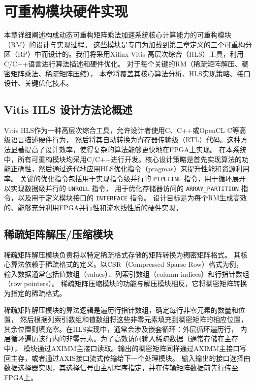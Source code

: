\chapter{可重构模块硬件实现}

本章详细阐述构成动态可重构矩阵乘法加速系统核心计算能力的可重构模块（RM）的设计与实现过程。
这些模块是专门为加载到第三章定义的三个可重构分区（RP）中而设计的。我们将采用Xilinx Vitis 高层次综合（HLS）工具，利用C/C++语言进行算法描述和硬件优化。
对于每个关键的RM（稀疏矩阵解压、稠密矩阵乘法、稀疏矩阵压缩），
本章将覆盖其核心算法分析、HLS实现策略、接口设计、关键优化技术。

\section{Vitis HLS 设计方法论概述}

Vitis HLS作为一种高层次综合工具，允许设计者使用C、C++或OpenCL C等高级语言描述硬件行为，
然后将其自动转换为寄存器传输级（RTL）代码。这种方法显著提高了设计效率，使得复杂的算法能够更快地在FPGA上实现。
在本系统中，所有可重构模块均采用C/C++进行开发。核心设计策略是首先实现算法的功能正确性，然后通过迭代地应用HLS优化指令（pragmas）来提升性能和资源利用率。
关键的优化指令包括用于实现指令级并行的 \verb|PIPELINE| 指令，用于循环展开以实现数据级并行的 \verb|UNROLL| 指令，
用于优化存储器访问的 \verb|ARRAY_PARTITION| 指令，以及用于定义模块接口的 \verb|INTERFACE| 指令。
设计目标是为每个RM生成高效的、能够充分利用FPGA并行性和流水线性质的硬件实现。

\section{稀疏矩阵解压/压缩模块}

稀疏矩阵解压模块负责将以特定稀疏格式存储的矩阵转换为稠密矩阵格式。
其核心算法依赖于稀疏格式的定义。以CSR（Compressed Sparse Row）格式为例，
输入数据通常包括值数组（values）、列索引数组（column indices）和行指针数组（row pointers）。
稀疏矩阵压缩模块的功能与解压模块相反，它将稠密矩阵转换为指定的稀疏格式。

稀疏矩阵解压模块的算法逻辑是遍历行指针数组，确定每行非零元素的数量和位置，
然后根据列索引数组和值数组将这些非零元素填充到稠密矩阵的相应位置，
其余位置则填充零。在HLS实现中，通常会涉及嵌套循环：外层循环遍历行，
内层循环遍历该行内的非零元素。为了高效访问输入稀疏数据（通常存储在主存中），
模块通过AXIMM主接口读取。输出的稠密矩阵同样通过AXIMM主接口写回主存，或者通过AXIS接口流式传输给下一个处理模块。
输入输出的接口选择由数据选择器实现，其选择信号由主机程序指定，并在传输矩阵数据前先行传至FPGA上。

